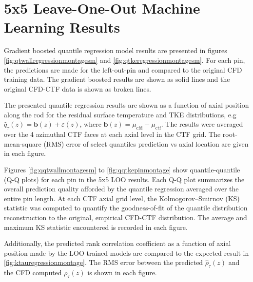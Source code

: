 


\section{5x5 Leave-One-Out Machine Learning Results}


Gradient boosted quantile regression model results are presented in figures \ref{fig:qtwallregressionmontagesm} and \ref{fig:qtkeregressionmontagesm}.  For each pin, the predictions are made for the left-out-pin and compared to the original CFD training data.  The gradient boosted results are shown as solid lines and the original CFD-CTF data is shown as broken lines. 

The presented quantile regression results are shown as a function of axial position along the rod for the residual surface temperature and TKE distributions, e.g $\hat q_{\tau}(z) = \mathbf b(z) + \varepsilon(z)$, where $\mathbf b(z) = \mu_{\mathrm{cfd}} - \mu_{\mathrm{ctf}}$.   The results were averaged over the 4 azimuthal CTF faces at each axial level in the CTF grid.   The root-mean-square (RMS) error of select quantiles prediction vs axial location are given in each figure.

Figures \ref{fig:qqtwallmontagesm} to \ref{fig:qqtkepinmontage} show quantile-quantile (Q-Q plots) for each pin in the 5x5 LOO results.  Each Q-Q plot summarizes the overall prediction quality afforded by the quantile regression averaged over the entire pin length.  At each CTF axial grid level, the Kolmogorov–Smirnov (KS) statistic was computed to quantify the goodness-of-fit of the quantile distribution reconstruction to the original, empirical CFD-CTF distribution. The average and maximum KS statistic encountered is recorded in each figure.

Additionally, the predicted rank correlation coefficient as a function of axial position made by the LOO-trained models are compared to the expected result in \ref{fig:ktauregressionmontage}.  The RMS error between the predicted $\hat \rho_\tau(z)$ and the CFD computed $\rho_\tau(z)$ is shown in each figure.

